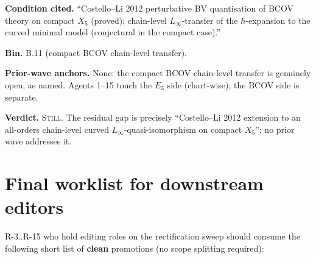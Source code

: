 \documentclass[11pt]{amsart}
\begin{document}
{{\textbf{Condition cited.} ``Costello--Li 2012 perturbative BV
quantisation of BCOV theory on compact $X_5$ (proved); chain-level
$L_\infty$-transfer of the $\hbar$-expansion to the curved minimal
model (conjectural in the compact case).''

\textbf{Bin.} B.11 (compact BCOV chain-level transfer).

\textbf{Prior-wave anchors.} None: the compact BCOV chain-level
transfer is genuinely open, as named. Agents 1--15 touch the $E_3$
side (chart-wise); the BCOV side is separate.

\textbf{Verdict.} \textsc{Still}. The residual gap is precisely
``Costello--Li 2012 extension to an all-orders chain-level curved
$L_\infty$-quasi-isomorphism on compact $X_5$''; no prior wave
addresses it.

\section{Final worklist for downstream editors}
\label{sec:worklist}

R-3..R-15 who hold editing roles on the rectification sweep should
consume the following short list of \textbf{clean} promotions (no scope
splitting required):

}}
\end{document}
